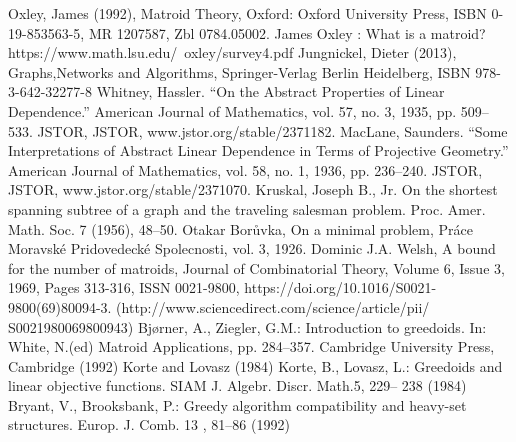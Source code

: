 \documentclass{article}
\theoremstyle{plain}
\theoremstyle{definition}
\theoremstyle{remark}
\begin{document}
\begin{thebibliography}{}
    Oxley, James (1992), Matroid Theory, Oxford: Oxford University Press, ISBN 0-19-853563-5, MR 1207587, Zbl 0784.05002.
    James Oxley : What is a matroid? https://www.math.lsu.edu/~oxley/survey4.pdf
	Jungnickel, Dieter (2013), Graphs,Networks and Algorithms, Springer-Verlag Berlin Heidelberg, ISBN 978-3-642-32277-8 
	Whitney, Hassler. “On the Abstract Properties of Linear Dependence.” American Journal of Mathematics, vol. 57, no. 3, 1935, pp. 		509–533. JSTOR, JSTOR, www.jstor.org/stable/2371182.
	MacLane, Saunders. “Some Interpretations of Abstract Linear Dependence in Terms of Projective Geometry.” American Journal of 			Mathematics, vol. 58, no. 1, 1936, pp. 236–240. JSTOR, JSTOR, www.jstor.org/stable/2371070.
	Kruskal, Joseph B., Jr. On the shortest spanning subtree of a graph and the traveling salesman problem. Proc. Amer. Math. Soc. 7 	(1956), 48–50. 
	Otakar Borůvka, On a minimal problem, Práce Moravské Pridovedecké Spolecnosti, vol. 3, 1926. 
	Dominic J.A. Welsh, A bound for the number of matroids, Journal of Combinatorial Theory, Volume 6, Issue 3, 1969, Pages 313-316, 	ISSN 0021-9800, https://doi.org/10.1016/S0021-9800(69)80094-3. (http://www.sciencedirect.com/science/article/pii/				S0021980069800943)
	Bjørner, A., Ziegler, G.M.: Introduction to greedoids. In: White, N.(ed) Matroid Applications, pp. 284–357. Cambridge University 	Press, Cambridge (1992)
	Korte and Lovasz (1984) Korte, B., Lovasz, L.: Greedoids and linear objective functions. SIAM J. Algebr. Discr. Math.5, 229– 			238 (1984)
	Bryant,  V.,  Brooksbank,  P.:  Greedy  algorithm  compatibility  and heavy-set structures. Europ. J. Comb. 13 , 81–86 (1992)
\end{thebibliography}
\end{document}
